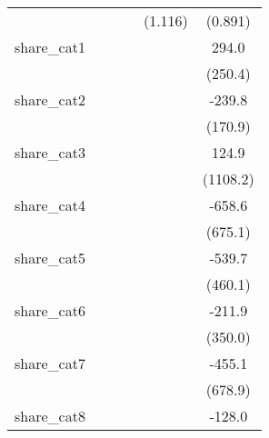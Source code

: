{\begin{tabular}{l*{5}{c}}
            &                     &                     &                     &     (1.116)         &     (0.891)         \\
[1em]
share\_cat1  &                     &                     &                     &                     &       294.0         \\
            &                     &                     &                     &                     &     (250.4)         \\
[1em]
share\_cat2  &                     &                     &                     &                     &      -239.8         \\
            &                     &                     &                     &                     &     (170.9)         \\
[1em]
share\_cat3  &                     &                     &                     &                     &       124.9         \\
            &                     &                     &                     &                     &    (1108.2)         \\
[1em]
share\_cat4  &                     &                     &                     &                     &      -658.6         \\
            &                     &                     &                     &                     &     (675.1)         \\
[1em]
share\_cat5  &                     &                     &                     &                     &      -539.7         \\
            &                     &                     &                     &                     &     (460.1)         \\
[1em]
share\_cat6  &                     &                     &                     &                     &      -211.9         \\
            &                     &                     &                     &                     &     (350.0)         \\
[1em]
share\_cat7  &                     &                     &                     &                     &      -455.1         \\
            &                     &                     &                     &                     &     (678.9)         \\
[1em]
share\_cat8  &                     &                     &                     &                     &      -128.0         \\

\end{tabular}}

